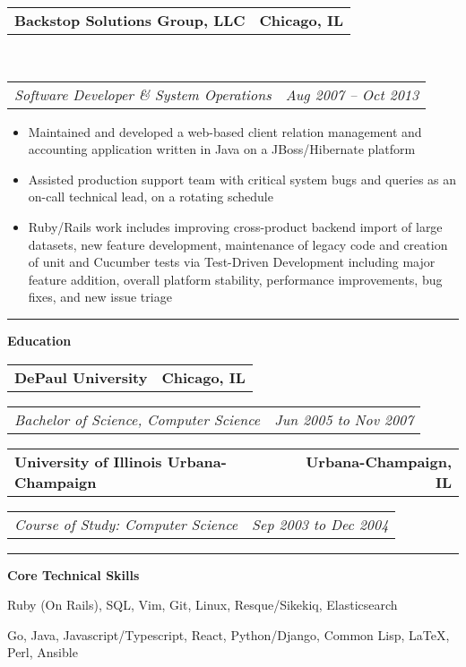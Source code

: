 \documentclass[10pt,letterpaper]{article}
\makeatletter
\newcommand{\headerrow}[2]
{\begin{tabular*}{\linewidth}{l@{\extracolsep{\fill}}r}
	#1 &
	#2 \\
\end{tabular*}}
\newenvironment{indentsection}[1]%
{\begin{list}{}%
	{\setlength{\leftmargin}{#1}}%
	\item[]%
}
{\end{list}}
\makeatother
\begin{document}
\begin{indentsection}{\parindent}
	\headerrow
		{\textbf{Backstop Solutions Group, LLC} }
		{\textbf{Chicago, IL}}
	\\
	\headerrow
		{\emph{Software Developer \& System Operations}}
		{\emph{Aug 2007 -- Oct 2013}}

	\begin{itemize}
	\renewcommand{\labelitemi}{$-$}
	\vspace{-0.1in}
		\item Maintained and developed a web-based client relation management and accounting application written in Java on a JBoss/Hibernate platform
		\item Assisted production support team with critical system bugs and queries as an on-call technical lead, on a rotating schedule
    \item Ruby/Rails work includes improving cross-product backend import of large datasets, new feature development, maintenance of legacy code and creation of unit and Cucumber tests via Test-Driven Development including major feature addition, overall platform stability, performance improvements, bug fixes, and new issue triage
	\end{itemize}
\end{indentsection}
\vspace{0.1in}
\hrule
\vspace{0.2in}
{\large \textbf{Education}}
\begin{indentsection}{\parindent}
	\headerrow
		{\textbf{DePaul University}}
		{\textbf{Chicago, IL}}
  \vspace{0.1in}
	\headerrow
		{\emph{Bachelor of Science, Computer Science}}
		{\emph{Jun 2005 to Nov 2007}}
  \headerrow
		{\textbf{University of Illinois Urbana-Champaign}}
		{\textbf{Urbana-Champaign, IL}}
  \headerrow
		{\emph{Course of Study: Computer Science}}
		{\emph{Sep 2003 to Dec 2004}}

\end{indentsection}
\vspace{0.1in}
\hrule
\vspace{0.2in}
{\large \textbf{Core Technical Skills}}
\begin{indentsection}{\parindent}
\begin{description}
	\item[Languages \& Tools]
  \item Ruby (On Rails), SQL, Vim, Git, Linux, Resque/Sikekiq, Elasticsearch
	\item[Limited Experience]
	\item Go, Java, Javascript/Typescript, React, Python/Django, Common Lisp, \LaTeX, Perl, Ansible
\end{description}
\end{indentsection}
\end{document}
